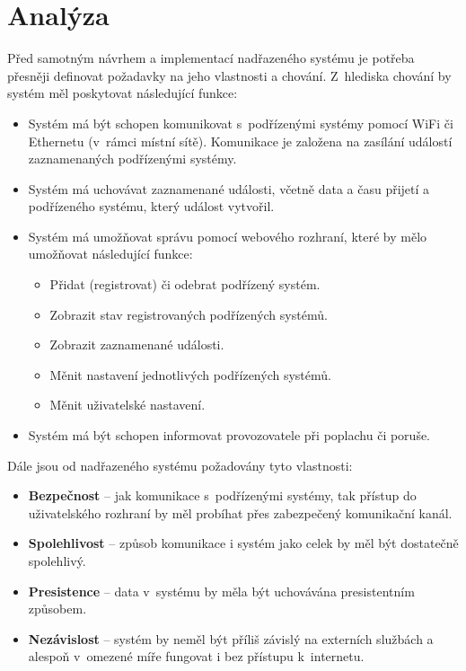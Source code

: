 \chapter{Analýza}
\label{sec:an}

Před samotným návrhem a implementací nadřazeného systému je potřeba přesněji definovat požadavky na jeho vlastnosti a chování. Z~hlediska chování by systém měl poskytovat následující funkce:

\begin{itemize}
    \item Systém má být schopen komunikovat s~podřízenými systémy pomocí WiFi či Ethernetu (v~rámci místní sítě). Komunikace je založena na zasílání událostí zaznamenaných podřízenými systémy.
    \item Systém má uchovávat zaznamenané události, včetně data a času přijetí a podřízeného systému, který událost vytvořil.
    \item Systém má umožňovat správu pomocí webového rozhraní, které by mělo umožňovat následující funkce:
        \begin{itemize}
            \item Přidat (registrovat) či odebrat podřízený systém.
            \item Zobrazit stav registrovaných podřízených systémů.
            \item Zobrazit zaznamenané události.
            \item Měnit nastavení jednotlivých podřízených systémů.
            \item Měnit uživatelské nastavení.
        \end{itemize}
    \item Systém má být schopen informovat provozovatele při poplachu či poruše.
\end{itemize}

Dále jsou od nadřazeného systému požadovány tyto vlastnosti:

\begin{itemize}
    \item \textbf{Bezpečnost} -- jak komunikace s~podřízenými systémy, tak přístup do uživatelského rozhraní by měl probíhat přes zabezpečený komunikační kanál.
    \item \textbf{Spolehlivost} -- způsob komunikace i systém jako celek by měl být dostatečně spolehlivý.
    \item \textbf{Presistence} -- data v~systému by měla být uchovávána presistentním způsobem.
    \item \textbf{Nezávislost} -- systém by neměl být příliš závislý na externích službách a alespoň v~omezené míře fungovat i bez přístupu k~internetu.
\end{itemize}

